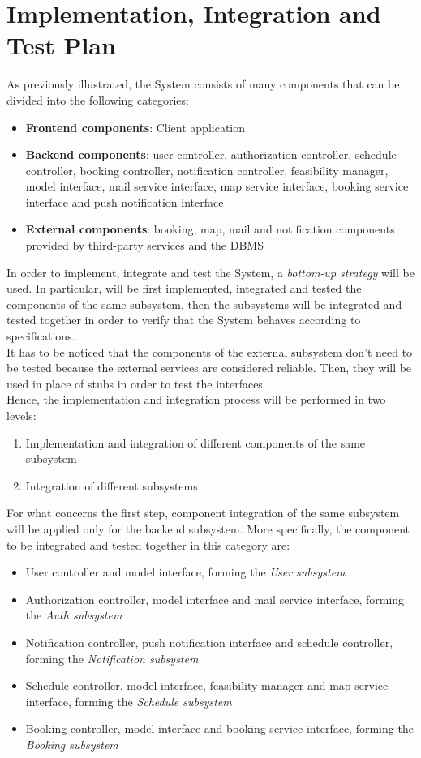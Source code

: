 \section{Implementation, Integration and Test Plan}
As previously illustrated, the System consists of many components that can be divided into the following categories:
\begin{itemize}
	\item \textbf{Frontend components}: Client application 
	\item \textbf{Backend components}: user controller, authorization controller, schedule controller, booking controller, notification controller, feasibility manager, model interface, mail service interface, map service interface, booking service interface and push notification interface
	\item \textbf{External components}: booking, map, mail and notification components provided by third-party services and the DBMS
\end{itemize}
In order to implement, integrate and test the System, a \textit{bottom-up strategy} will be used. In particular, will be first implemented, integrated and tested the components of the same subsystem, then the subsystems will be integrated and tested together in order to verify that the System behaves according to specifications.\\
It has to be noticed that the components of the external subsystem don't need to be tested because the external services are considered reliable. Then, they will be used in place of stubs in order to test the interfaces.\\
Hence, the implementation and integration process will be performed in two levels:
\begin{enumerate}
	\item Implementation and integration of different components of the same subsystem
	\item Integration of different subsystems
\end{enumerate}
For what concerns the first step, component integration of the same subsystem will be applied only for the backend subsystem. More specifically, the component to be integrated and tested together in this category are:
\begin{itemize}
	\item User controller and model interface, forming the \textit{User subsystem}
	\item Authorization controller, model interface and mail service interface, forming the \textit{Auth subsystem}
	\item Notification controller, push notification interface and schedule controller, forming the \textit{Notification subsystem}
	\item Schedule controller, model interface, feasibility manager and map service interface, forming the \textit{Schedule subsystem}
	\item Booking controller, model interface and booking service interface, forming the \textit{Booking subsystem}
\end{itemize}
